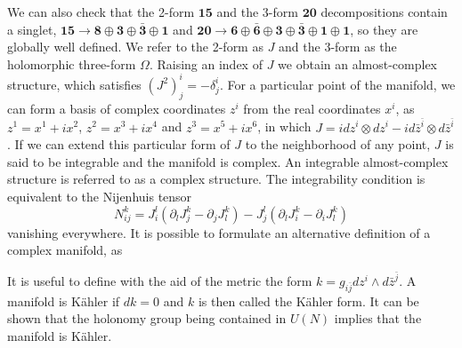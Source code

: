 We can also check that the 2-form $\mathbf {15}$ and the 3-form $\mathbf{20}$ decompositions contain a singlet, 
$\mathbf {15}\to \mathbf 8\oplus \mathbf 3\oplus \bar {\mathbf 3}\oplus \mathbf 1$ and 
$\mathbf {20}\to \mathbf 6\oplus \bar{\mathbf 6}\oplus\mathbf 3\oplus \bar {\mathbf 3}\oplus \mathbf 1\oplus \mathbf 1$,
so they are globally well defined.
We refer to the 2-form as $J$ and the 3-form as the holomorphic three-form $\Omega$.
Raising an index of $J$ we obtain an almost-complex structure, which satisfies $(J^2)^i_j=-\delta^i_j$.
For a particular point of the manifold, we can form a basis of complex coordinates $z^i$ from the real coordinates $x^i$,
as $z^1=x^1+ix^2$, $z^2=x^3+ix^4$ and $z^3=x^5+ix^6$,
in which $J=idz^i\otimes dz^i - i d\bar z^{\bar i}\otimes d\bar z^{\bar i}$.
If we can extend this particular form of $J$ to the neighborhood of any point, $J$ is said to be integrable
and the manifold is complex.
An integrable almost-complex structure is referred to as a complex structure. 
The integrability condition is equivalent to the Nijenhuis tensor 
\begin{equation}
  N^k_{ij}= J^l_i(\partial_l J^k_j - \partial_j J^k_l) - J_j^l (\partial_l J^k_i - \partial_i J^k_l)
\end{equation}
vanishing everywhere.
It is possible to formulate an alternative definition of a complex manifold, as 

It is useful to define with the aid of the metric the form $k=g_{i\bar j} dz^i \wedge d\bar z^{\bar j}$.
A manifold is Kähler if $dk=0$ and $k$ is then called the Kähler form.
It can be shown that the holonomy group being contained in $U(N)$ implies that the manifold is Kähler.

